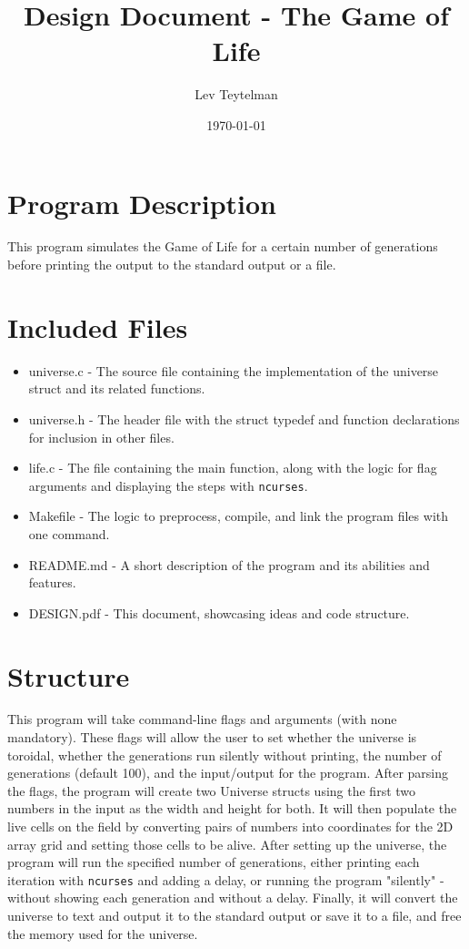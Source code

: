 \documentclass[12pt]{article}
\title{Design Document - The Game of Life}
\author{Lev Teytelman}
\date{\today}
\begin{document}
\maketitle
\section{Program Description}

This program simulates the Game of Life for a certain number of generations before printing the output to the standard output or a file.
\section{Included Files}

\begin{itemize}
    \item universe.c - The source file containing the implementation of the universe struct and its related functions.
    \item universe.h - The header file with the struct typedef and function declarations for inclusion in other files.
    \item life.c - The file containing the main function, along with the logic for flag arguments and displaying the steps with \verb|ncurses|.
    \item Makefile - The logic to preprocess, compile, and link the program files with one command.
    \item README.md - A short description of the program and its abilities and features.
    \item DESIGN.pdf - This document, showcasing ideas and code structure.
\end{itemize}
\section{Structure}

This program will take command-line flags and arguments (with none mandatory). These flags will allow the user to set whether the universe is toroidal, whether the generations run silently without printing, the number of generations (default 100), and the input/output for the program. After parsing the flags, the program will create two Universe structs using the first two numbers in the input as the width and height for both. It will then populate the live cells on the field by converting pairs of numbers into coordinates for the 2D array grid and setting those cells to be alive. After setting up the universe, the program will run the specified number of generations, either printing each iteration with \verb|ncurses| and adding a delay, or running the program "silently" - without showing each generation and without a delay. Finally, it will convert the universe to text and output it to the standard output or save it to a file, and free the memory used for the universe.
\end{document}
